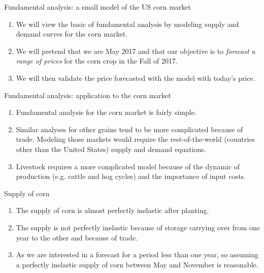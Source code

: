 \documentclass[table,xcolor=pdftex,dvipsnames, handout]{beamer}\usepackage[]{graphicx}\usepackage[]{color}
\begin{document}

\begin{frame}{Fundamental analysis: a small model of the US corn market}
\begin{enumerate}[label=\textbullet]
  \item We will view the basic of fundamental analysis by modeling supply and demand curves for the corn market.
  \item \textcolor[rgb]{1.00,0.00,0.00}{We will pretend that we are May 2017 and that our objective is to \emph{forecast a range of prices} for the corn crop in the Fall of 2017.}
  \item We will then validate the price forecasted with the model with today's price.
\end{enumerate}
\end{frame}


\begin{frame}{Fundamental analysis: application to the corn market}
\begin{enumerate}[label=\textbullet]
  \item Fundamental analysis for the corn market is fairly simple.
  \item Similar analyses for other grains tend to be more complicated because of trade. Modeling those markets would require the rest-of-the-world (countries other than the United States) supply and demand equations.
  \item Livestock requires a more complicated model because of the dynamic of production (e.g. cattle and hog cycles) and the importance of input costs.
\end{enumerate}
\end{frame}


\begin{frame}{Supply of corn}
\begin{enumerate}[label=\textbullet]
  \item The supply of corn is almost perfectly inelastic after planting.
  \item The supply is not perfectly inelastic because of storage carrying over from one year to the other and because of trade.
  \item As we are interested in a forecast for a period less than one year, so assuming a perfectly inelastic supply of corn between May and November is reasonable.
\end{enumerate}
\end{frame}
\end{document}
